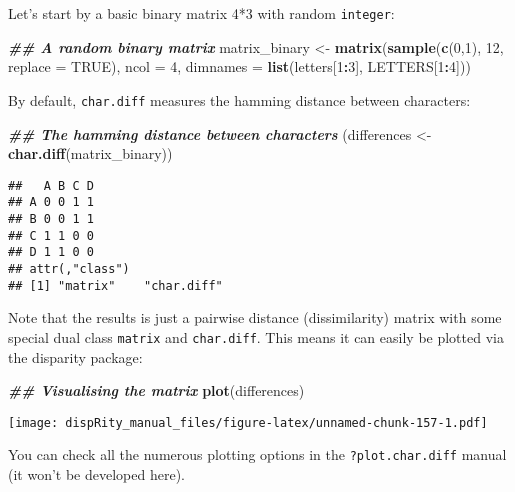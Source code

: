 \documentclass[
]{book}
\newenvironment{Shaded}{\begin{snugshade}}{\end{snugshade}}
\newcommand{\AttributeTok}[1]{\textcolor[rgb]{0.13,0.29,0.53}{#1}}
\newcommand{\ConstantTok}[1]{\textcolor[rgb]{0.56,0.35,0.01}{#1}}
\newcommand{\DecValTok}[1]{\textcolor[rgb]{0.00,0.00,0.81}{#1}}
\newcommand{\DocumentationTok}[1]{\textcolor[rgb]{0.56,0.35,0.01}{\textbf{\textit{#1}}}}
\newcommand{\FunctionTok}[1]{\textcolor[rgb]{0.13,0.29,0.53}{\textbf{#1}}}
\newcommand{\NormalTok}[1]{#1}
\newcommand{\OtherTok}[1]{\textcolor[rgb]{0.56,0.35,0.01}{#1}}
\newcommand{\SpecialCharTok}[1]{\textcolor[rgb]{0.81,0.36,0.00}{\textbf{#1}}}
\begin{document}
Let's start by a basic binary matrix 4*3 with random \texttt{integer}:

\begin{Shaded}
\begin{Highlighting}[]
\DocumentationTok{\#\# A random binary matrix}
\NormalTok{matrix\_binary }\OtherTok{\textless{}{-}} \FunctionTok{matrix}\NormalTok{(}\FunctionTok{sample}\NormalTok{(}\FunctionTok{c}\NormalTok{(}\DecValTok{0}\NormalTok{,}\DecValTok{1}\NormalTok{), }\DecValTok{12}\NormalTok{, }\AttributeTok{replace =} \ConstantTok{TRUE}\NormalTok{), }\AttributeTok{ncol =} \DecValTok{4}\NormalTok{,}
                        \AttributeTok{dimnames =} \FunctionTok{list}\NormalTok{(letters[}\DecValTok{1}\SpecialCharTok{:}\DecValTok{3}\NormalTok{], LETTERS[}\DecValTok{1}\SpecialCharTok{:}\DecValTok{4}\NormalTok{]))}
\end{Highlighting}
\end{Shaded}

By default, \texttt{char.diff} measures the hamming distance between characters:

\begin{Shaded}
\begin{Highlighting}[]
\DocumentationTok{\#\# The hamming distance between characters}
\NormalTok{(differences }\OtherTok{\textless{}{-}} \FunctionTok{char.diff}\NormalTok{(matrix\_binary))}
\end{Highlighting}
\end{Shaded}

\begin{verbatim}
##   A B C D
## A 0 0 1 1
## B 0 0 1 1
## C 1 1 0 0
## D 1 1 0 0
## attr(,"class")
## [1] "matrix"    "char.diff"
\end{verbatim}

Note that the results is just a pairwise distance (dissimilarity) matrix with some special dual class \texttt{matrix} and \texttt{char.diff}.
This means it can easily be plotted via the disparity package:

\begin{Shaded}
\begin{Highlighting}[]
\DocumentationTok{\#\# Visualising the matrix}
\FunctionTok{plot}\NormalTok{(differences)}
\end{Highlighting}
\end{Shaded}

\texttt{[image: dispRity\_manual\_files/figure-latex/unnamed-chunk-157-1.pdf]}

You can check all the numerous plotting options in the \texttt{?plot.char.diff} manual (it won't be developed here).
\end{document}
